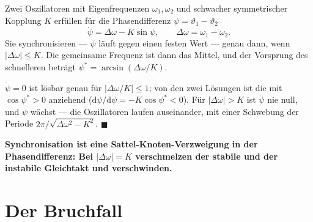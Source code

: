 \begin{merksatz}
Zwei Oszillatoren mit Eigenfrequenzen $\omega_1, \omega_2$ und schwacher symmetrischer Kopplung $K$ erfüllen für die Phasendifferenz $\psi = \vartheta_1 - \vartheta_2$
\[ \dot\psi = \Delta\omega - K\sin\psi, \qquad \Delta\omega = \omega_1 - \omega_2 . \]
Sie synchronisieren --- $\psi$ läuft gegen einen festen Wert --- genau dann, wenn $|\Delta\omega| \le K$. Die gemeinsame Frequenz ist dann das Mittel, und der Vorsprung des schnelleren beträgt $\psi^{*} = \arcsin(\Delta\omega/K)$.

$\dot\psi = 0$ ist lösbar genau für $|\Delta\omega/K| \le 1$; von den zwei Lösungen ist die mit $\cos\psi^{*} > 0$ anziehend ($\mathrm d\dot\psi/\mathrm d\psi = -K\cos\psi^{*} < 0$). Für $|\Delta\omega| > K$ ist $\dot\psi$ nie null, und $\psi$ wächst --- die Oszillatoren laufen auseinander, mit einer Schwebung der Periode $2\pi/\sqrt{\Delta\omega^{2}-K^{2}}$. $\blacksquare$

\begin{center}
\begin{minipage}{0.9\textwidth}
\textbf{Synchronisation ist eine Sattel-Knoten-Verzweigung in der Phasendifferenz: Bei $|\Delta\omega| = K$ verschmelzen der stabile und der instabile Gleichtakt und verschwinden.}
\end{minipage}
\end{center}

\begin{center}
\begin{minipage}{0.88\textwidth}
\end{minipage}
\end{center}
\end{merksatz}

\section{Der Bruchfall}


